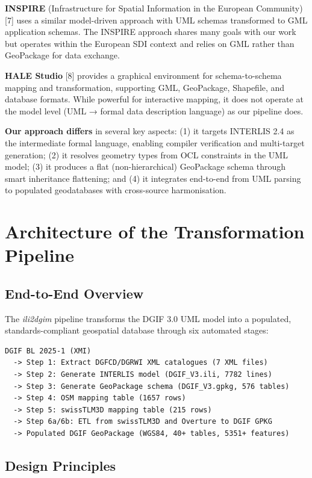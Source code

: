 \documentclass[conference]{IEEEtran}
\begin{document}
\textbf{INSPIRE} (Infrastructure for Spatial Information in the European Community) [7] uses a similar model-driven approach with UML schemas transformed to GML application schemas. The INSPIRE approach shares many goals with our work but operates within the European SDI context and relies on GML rather than GeoPackage for data exchange.

\textbf{HALE Studio} [8] provides a graphical environment for schema-to-schema mapping and transformation, supporting GML, GeoPackage, Shapefile, and database formats. While powerful for interactive mapping, it does not operate at the model level (UML → formal data description language) as our pipeline does.

\textbf{Our approach differs} in several key aspects: (1) it targets INTERLIS 2.4 as the intermediate formal language, enabling compiler verification and multi-target generation; (2) it resolves geometry types from OCL constraints in the UML model; (3) it produces a flat (non-hierarchical) GeoPackage schema through smart inheritance flattening; and (4) it integrates end-to-end from UML parsing to populated geodatabases with cross-source harmonisation.



\section{Architecture of the Transformation Pipeline}

\subsection{End-to-End Overview}

The \textit{ili2dgim} pipeline transforms the DGIF 3.0 UML model into a populated, standards-compliant geospatial database through six automated stages:

\begin{lstlisting}
DGIF BL 2025-1 (XMI)
  -> Step 1: Extract DGFCD/DGRWI XML catalogues (7 XML files)
  -> Step 2: Generate INTERLIS model (DGIF_V3.ili, 7782 lines)
  -> Step 3: Generate GeoPackage schema (DGIF_V3.gpkg, 576 tables)
  -> Step 4: OSM mapping table (1657 rows)
  -> Step 5: swissTLM3D mapping table (215 rows)
  -> Step 6a/6b: ETL from swissTLM3D and Overture to DGIF GPKG
  -> Populated DGIF GeoPackage (WGS84, 40+ tables, 5351+ features)
\end{lstlisting}


\subsection{Design Principles}
\end{document}
